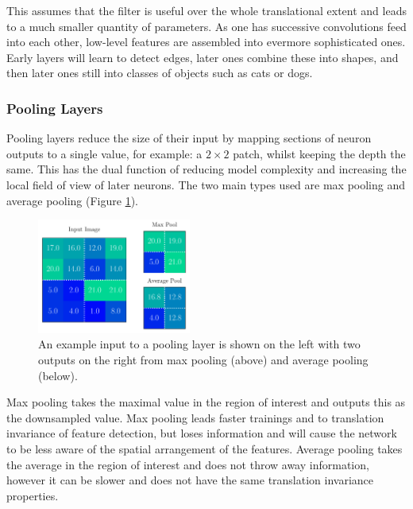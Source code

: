 This assumes that the filter is useful over the whole translational extent and leads to a much smaller quantity of parameters. As one has successive convolutions feed into each other, low-level features are assembled into evermore sophisticated ones. Early layers will learn to detect edges, later ones combine these into shapes, and then later ones still into classes of objects such as cats or dogs. 


\subsubsection{Pooling Layers}
Pooling layers reduce the size of their input by mapping sections of neuron outputs to a single value, for example: a $2\times{}2$ patch, whilst keeping the depth the same.
This has the dual function of reducing model complexity and increasing the local field of view of later neurons. 
The two main types used are max pooling and average pooling (Figure \ref{fig:machine_learning:pooling}). 
\begin{figure}[h!]
    \includegraphics[width=0.45\textwidth]{figures/machine_learning/pooling.pdf}
    \caption{An example input to a pooling layer is shown on the left with two outputs on the right from max pooling (above) and average pooling (below).}
        \label{fig:machine_learning:pooling}
\end{figure}

Max pooling takes the maximal value in the region of interest and outputs this as the downsampled value. Max pooling leads faster trainings and to translation invariance of feature detection, but loses information and will cause the network to be less aware of the spatial arrangement of the features. 
Average pooling takes the average in the region of interest and does not throw away information, however it can be slower and does not have the same translation invariance properties. 



